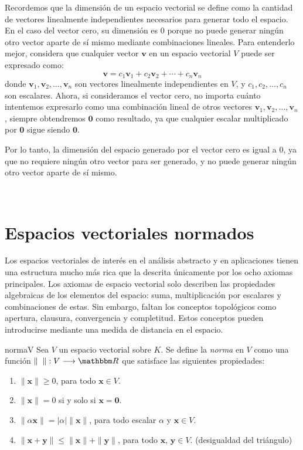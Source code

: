 Recordemos que la dimensión de un espacio vectorial se define como la cantidad de vectores linealmente independientes necesarios para generar todo el espacio. En el caso del vector cero, su dimensión es $0$ porque no puede generar ningún otro vector aparte de sí mismo mediante combinaciones lineales. Para entenderlo mejor, considera que cualquier vector $\mathbf{v}$ en un espacio vectorial $V$ puede ser expresado como:
$$\mathbf{v} = c_1 \mathbf{v}_1 + c_2 \mathbf{v}_2 + \cdots + c_n \mathbf{v}_n$$
donde $\mathbf{v}_1, \mathbf{v}_2, \dots, \mathbf{v}_n$ son vectores linealmente independientes en $V$, y $c_1, c_2, \dots, c_n$ son escalares. Ahora, si consideramos el vector cero, no importa cuánto intentemos expresarlo como una combinación lineal de otros vectores $\mathbf{v}_1, \mathbf{v}_2, \dots, \mathbf{v}_n$, siempre obtendremos $\mathbf{0}$ como resultado, ya que cualquier escalar multiplicado por $\mathbf{0}$ sigue siendo $\mathbf{0}$.

Por lo tanto, la dimensión del espacio generado por el vector cero es igual a $0$, ya que no requiere ningún otro vector para ser generado, y no puede generar ningún otro vector aparte de sí mismo.

\newpage

~

\newpage

\section{Espacios vectoriales normados}

Los espacios vectoriales de interés en el análisis abstracto y en aplicaciones tienen una estructura mucho más rica que la descrita únicamente por los ocho axiomas principales. Los axiomas de espacio vectorial solo describen las propiedades algebraicas de los elementos del espacio: suma, multiplicación por escalares y combinaciones de estas. Sin embargo, faltan los conceptos topológicos como apertura, clausura, convergencia y completitud. Estos conceptos pueden introducirse mediante una medida de distancia en el espacio.

\begin{definicion}{}{normaV}
    Sea $V$ un espacio vectorial sobre $K$. Se define la \emph{norma} en $V$ como una función $\| \phantom{x} \| : V \longrightarrow \RR$ que satisface las siguientes propiedades:
    \begin{enumerate}[label=\roman*), topsep=6pt, itemsep=0pt]
        \item $\| \mathbf{x} \| \geq 0$, para todo $\mathbf{x} \in V$.
        \item $\| \mathbf{x} \| = 0$ si y solo si $\mathbf{x} = \mathbf{0}$.
        \item $\| \alpha \mathbf{x} \| = |\alpha| \| \mathbf{x} \|$, para todo escalar $\alpha$ y $\mathbf{x} \in V$.
        \item $\| \mathbf{x} + \mathbf{y} \| \leq \| \mathbf{x} \| + \| \mathbf{y} \|$, para todo $\mathbf{x}$, $\mathbf{y} \in V$. \hfill (desigualdad del triángulo)
    \end{enumerate}
\end{definicion}

